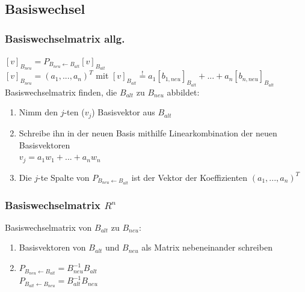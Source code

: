 \documentclass[german, fourcolumn, 8pt]{latex4ei/latex4ei_sheet}
\begin{document}
\subsection{Basiswechsel}
\begin{sectionbox}
    \subsubsection{Basiswechselmatrix allg.}
    $[v]_{B_{neu}}=P_{B_{neu} \leftarrow B_{alt}}[v]_{B_{alt}}$\\
    $[v]_{B_{neu}}=(a_1,...,a_n)^T$ mit $[v]_{B_{alt}}\overset{!}{=}a_1[b_{1,neu}]_{B_{alt}} + ... + a_n[b_{n,neu}]_{B_{alt}}$\\

    Basiswechselmatrix finden, die $B_{alt}$ zu $B_{neu}$ abbildet:
    \begin{enumerate}
        \item Nimm den $j$-ten ($v_j$) Basisvektor aus $B_{alt}$
        \item Schreibe ihn in der neuen Basis mithilfe Linearkombination der neuen Basisvektoren\\
              $v_j=a_1w_1+...+a_nw_n$
        \item Die $j$-te Spalte von $P_{B_{neu} \leftarrow B_{alt}}$ ist der Vektor der Koeffizienten $(a_1, ..., a_n)^T$
    \end{enumerate}
\end{sectionbox}

\begin{sectionbox}
    \subsubsection{Basiswechselmatrix $R^n$}
    Basiswechselmatrix von $B_{alt}$ zu $B_{neu}$:
    \begin{enumerate}
        \item Basisvektoren von $B_{alt}$ und $B_{neu}$ als Matrix nebeneinander schreiben
        \item $P_{B_{neu} \leftarrow B_{alt}}=B_{neu}^{-1}B_{alt}$\\
              $P_{B_{alt} \leftarrow B_{neu}}=B_{alt}^{-1}B_{neu}$
    \end{enumerate}
\end{sectionbox}
\end{document}
